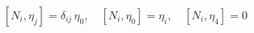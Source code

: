 \begin{equation}\label{24}
 [N_i,\eta_j] =  \delta_{ij}\, \eta_0, \quad [N_i, \eta_0] =  \eta_i,\quad [N_i, \eta_4] =0
\end{equation}

